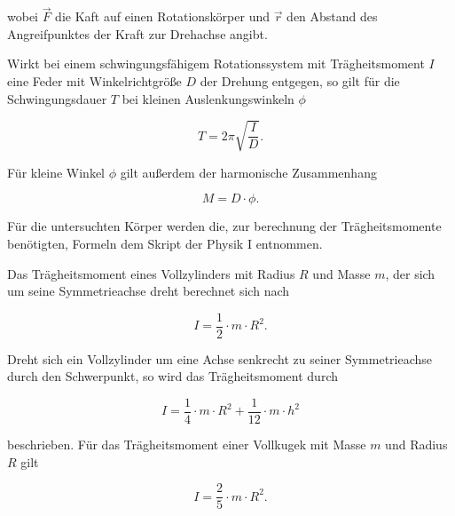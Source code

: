 \noindent wobei $\vec{F}$ die Kaft auf einen
Rotationskörper und $\vec{r}$ den Abstand des 
Angreifpunktes der Kraft zur Drehachse angibt.

Wirkt bei einem schwingungsfähigem Rotationssystem
mit Trägheitsmoment $I$
eine Feder mit Winkelrichtgröße $D$ der Drehung entgegen,
so gilt für die Schwingungsdauer $T$ bei kleinen 
Auslenkungswinkeln $\phi$

\begin{equation}
    T=2\pi \sqrt{\frac{I}{D}}.
\end{equation}

\noindent Für kleine Winkel $\phi$ gilt außerdem der
harmonische Zusammenhang

\begin{equation}
    M=D \cdot \phi.
\end{equation}

\noindent Für die untersuchten Körper werden 
die, zur berechnung der Trägheitsmomente benötigten,
Formeln dem Skript der Physik I \cite{Skript} entnommen.

Das Trägheitsmoment eines Vollzylinders mit Radius $R$
und Masse $m$, der sich um seine
Symmetrieachse dreht berechnet sich nach

\begin{equation}
    I=\frac{1}{2} \cdot m \cdot R^2.
\end{equation}

\noindent Dreht sich ein Vollzylinder um eine Achse senkrecht
zu seiner Symmetrieachse durch den Schwerpunkt, so wird das Trägheitsmoment durch

\begin{equation}
    I=\frac{1}{4} \cdot m \cdot R^2 + \frac{1}{12} \cdot m \cdot h^2
\end{equation}

\noindent beschrieben. Für das Trägheitsmoment einer
Vollkugek  mit Masse $m$ und Radius $R$ gilt

\begin{equation}
    I=\frac{2}{5} \cdot m \cdot R^2.
\end{equation}
